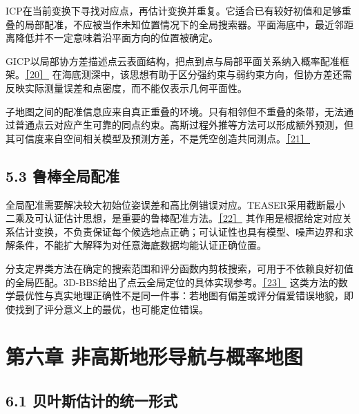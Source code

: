 ICP在当前变换下寻找对应点，再估计变换并重复。它适合已有较好初值和足够重叠的局部配准，不应被当作未知位置情况下的全局搜索器。平面海底中，最近邻距离降低并不一定意味着沿平面方向的位置被确定。

GICP以局部协方差描述点云表面结构，把点到点与局部平面关系纳入概率配准框架。\href{https://www.robots.ox.ac.uk/~avsegal/resources/papers/Generalized_ICP.pdf}{［20］} 在海底测深中，该思想有助于区分强约束与弱约束方向，但协方差还需反映实际测量误差和点密度，而不能仅表示几何平面性。

子地图之间的配准信息应来自真正重叠的环境。只有相邻但不重叠的条带，无法通过普通点云对应产生可靠的同点约束。高斯过程外推等方法可以形成额外预测，但其可信度来自空间相关模型及预测方差，不是凭空创造共同测点。\href{https://www-personal.acfr.usyd.edu.au/sbarkby/2011_iros_bpslam.pdf}{［21］}

\hypertarget{ux9c81ux68d2ux5168ux5c40ux914dux51c6}{%
\subsection{5.3 鲁棒全局配准}\label{ux9c81ux68d2ux5168ux5c40ux914dux51c6}}

全局配准需要解决较大初始位姿误差和高比例错误对应。TEASER采用截断最小二乘及可认证估计思想，是重要的鲁棒配准方法。\href{https://arxiv.org/abs/2001.07715}{［22］} 其作用是根据给定对应关系估计变换，不负责保证每个候选地点正确；可认证性也具有模型、噪声边界和求解条件，不能扩大解释为对任意海底数据均能认证正确位置。

分支定界类方法在确定的搜索范围和评分函数内剪枝搜索，可用于不依赖良好初值的全局匹配。3D-BBS给出了点云全局定位的具体实现参考。\href{https://arxiv.org/abs/2310.10023}{［23］} 这类方法的数学最优性与真实地理正确性不是同一件事：若地图有偏差或评分偏爱错误地貌，即使找到了评分意义上的最优，也可能定位错误。

\hypertarget{ux7b2cux516dux7ae0-ux975eux9ad8ux65afux5730ux5f62ux5bfcux822aux4e0eux6982ux7387ux5730ux56fe}{%
\section{第六章 非高斯地形导航与概率地图}\label{ux7b2cux516dux7ae0-ux975eux9ad8ux65afux5730ux5f62ux5bfcux822aux4e0eux6982ux7387ux5730ux56fe}}

\hypertarget{ux8d1dux53f6ux65afux4f30ux8ba1ux7684ux7edfux4e00ux5f62ux5f0f}{%
\subsection{6.1 贝叶斯估计的统一形式}\label{ux8d1dux53f6ux65afux4f30ux8ba1ux7684ux7edfux4e00ux5f62ux5f0f}}

